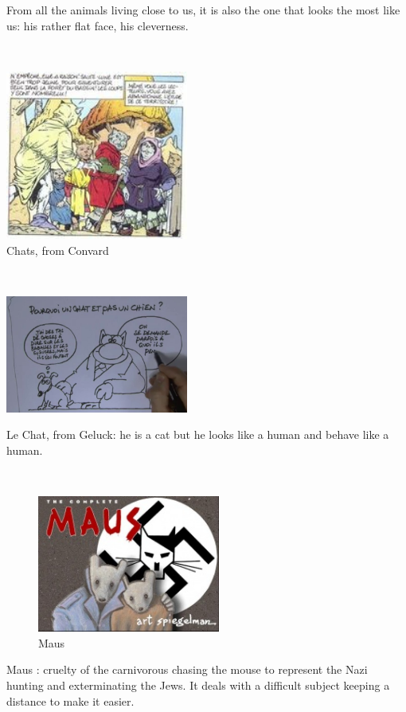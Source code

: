 \documentclass[a0,portrait,20pt]{a0poster}
\begin{document}
\begin{multicols}{2}
From all the animals living close to us, it is also the one that looks the most like us: his rather flat face, his cleverness.

~

\begin{center}\includegraphics[width=6cm]{chats.png} \\ Chats, from Convard\end{center}

~

\begin{center}
    \includegraphics[width=6cm]{chat.png}

    Le Chat, from Geluck: he is a cat but he looks like a human and behave like a human.
\end{center}

~

\begin{figure}\includegraphics[width=6cm]{maus.jpg}\caption{Maus}\end{figure}
Maus : cruelty of the carnivorous chasing the mouse to represent the Nazi hunting and exterminating the Jews. It deals with a difficult subject keeping a distance to make it easier.


\end{multicols}
\end{document}
